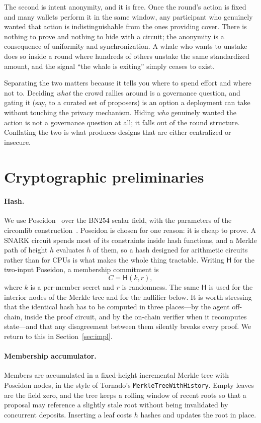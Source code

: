 \documentclass[11pt]{article}
\newcommand{\hash}{\mathsf{H}}
\newcommand{\code}[1]{\texttt{#1}}
\begin{document}
The second is intent anonymity, and it is free. Once the round's action is fixed
and many wallets perform it in the same window, any participant who genuinely
wanted that action is indistinguishable from the ones providing cover. There is
nothing to prove and nothing to hide with a circuit; the anonymity is a
consequence of uniformity and synchronization. A whale who wants to unstake does
so inside a round where hundreds of others unstake the same standardized amount,
and the signal ``the whale is exiting'' simply ceases to exist.

Separating the two matters because it tells you where to spend effort and where
not to. Deciding \emph{what} the crowd rallies around is a governance question,
and gating it (say, to a curated set of proposers) is an option a deployment can
take without touching the privacy mechanism. Hiding \emph{who} genuinely wanted
the action is not a governance question at all; it falls out of the round
structure. Conflating the two is what produces designs that are either
centralized or insecure.

\section{Cryptographic preliminaries}
\label{sec:prelim}

\paragraph{Hash.} We use Poseidon~\cite{poseidon} over the BN254 scalar field,
with the parameters of the circomlib construction~\cite{circom}. Poseidon is
chosen for one reason: it is cheap to prove. A SNARK circuit spends most of its
constraints inside hash functions, and a Merkle path of height $h$ evaluates $h$
of them, so a hash designed for arithmetic circuits rather than for CPUs is what
makes the whole thing tractable. Writing $\hash$ for the two-input Poseidon, a
membership commitment is
\[
  C = \hash(k, r),
\]
where $k$ is a per-member secret and $r$ is randomness. The same $\hash$ is used
for the interior nodes of the Merkle tree and for the nullifier below. It is
worth stressing that the identical hash has to be computed in three places---by
the agent off-chain, inside the proof circuit, and by the on-chain verifier when
it recomputes state---and that any disagreement between them silently breaks
every proof. We return to this in Section~\ref{sec:impl}.

\paragraph{Membership accumulator.} Members are accumulated in a fixed-height
incremental Merkle tree with Poseidon nodes, in the style of Tornado's
\code{MerkleTreeWithHistory}. Empty leaves are the field zero, and the tree keeps
a rolling window of recent roots so that a proposal may reference a slightly stale
root without being invalidated by concurrent deposits. Inserting a leaf costs
$h$ hashes and updates the root in place.
\end{document}
